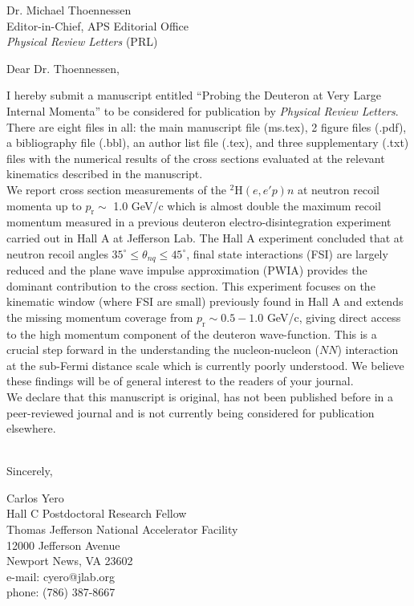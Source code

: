 \documentclass{letter}
\begin{document}
\begin{letter}{
    Dr. Michael Thoennessen\\
    Editor-in-Chief, APS Editorial Office \\
    \textit{Physical Review Letters} (PRL)\\
    }


\opening{Dear Dr. Thoennessen,\\}

I hereby submit a manuscript entitled ``Probing the Deuteron at Very Large Internal Momenta'' to be considered for publication by \textit{Physical Review Letters}.
There are eight files in all: the main manuscript file (ms.tex), 2 figure files (.pdf), a bibliography file (.bbl), an author list file (.tex), and three supplementary (.txt)
files with the numerical results of the cross sections evaluated at the relevant kinematics described in the manuscript.\\

We report cross section measurements of the $^{2}$H$(e,e'p)n$ at neutron recoil momenta up to $p_{\mathrm{r}}\sim$ 1.0 GeV/c which is almost
double the maximum recoil momentum measured in a previous deuteron electro-disintegration experiment carried out in Hall A at Jefferson Lab. 
The Hall A experiment concluded that at neutron recoil angles $35^{\circ}\leq \theta_{nq}\leq 45^{\circ}$, final state interactions (FSI) are largely
reduced and the plane wave impulse approximation (PWIA) provides the dominant contribution to the cross section. This experiment focuses
on the kinematic window (where FSI are small) previously found in Hall A and extends the missing momentum coverage from $p_{\mathrm{r}}\sim0.5 - 1.0$ GeV/c, giving
direct access to the high momentum component of the deuteron wave-function. This is a crucial step forward in the understanding the nucleon-nucleon ($NN$) interaction at
the sub-Fermi distance scale which is currently poorly understood. We believe these findings will be of general interest to the readers of your journal.\\

We declare that this manuscript is original, has not been published before in a peer-reviewed journal and is not currently being considered for publication elsewhere.\\
\\
\closing{Sincerely,
}
Carlos Yero\\
Hall C Postdoctoral Research Fellow\\
Thomas Jefferson National Accelerator Facility\\
12000 Jefferson Avenue \\
Newport News, VA 23602\\
e-mail: cyero@jlab.org\\
phone: (786) 387-8667 

\end{letter}
\end{document}
